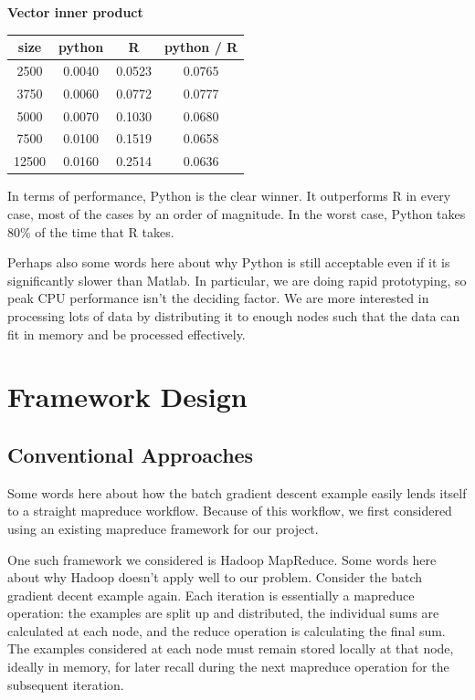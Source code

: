 \documentclass[%
        final,
        notitlepage,
        narroweqnarray,
        inline,
        ]{ieee}
\begin{document}
\begin{center}
\vspace{1em}
\textbf{Vector inner product} \\
\begin{tabular}{cccc}
size  & python  &  R       & python / R \\
  \hline
2500  & 0.0040 & 0.0523 & 0.0765 \\
3750  & 0.0060 & 0.0772 & 0.0777 \\
5000  & 0.0070 & 0.1030 & 0.0680 \\
7500  & 0.0100 & 0.1519 & 0.0658 \\
12500 & 0.0160 & 0.2514 & 0.0636 \\
\end{tabular}

\end{center}

In terms of performance, Python is the clear winner. It outperforms R in every
case, most of the cases by an order of magnitude. In the worst case, Python
takes 80\% of the time that R takes.

Perhaps also some words here about why Python is still acceptable even if it is
significantly slower than Matlab. In particular, we are doing rapid
prototyping, so peak CPU performance isn't the deciding factor. We are more
interested in processing lots of data by distributing it to enough nodes such
that the data can fit in memory and be processed effectively.

\section{Framework Design}

\subsection{Conventional Approaches}

Some words here about how the batch gradient descent example easily lends
itself to a straight mapreduce workflow. Because of this workflow, we first
considered using an existing mapreduce framework for our project.

One such framework we considered is Hadoop MapReduce. Some words here about why
Hadoop doesn't apply well to our problem. Consider the batch gradient decent
example again. Each iteration is essentially a mapreduce operation: the
examples are split up and distributed, the individual sums are calculated at
each node, and the reduce operation is calculating the final sum. The examples
considered at each node must remain stored locally at that node, ideally in
memory, for later recall during the next mapreduce operation for the subsequent
iteration.
\end{document}
